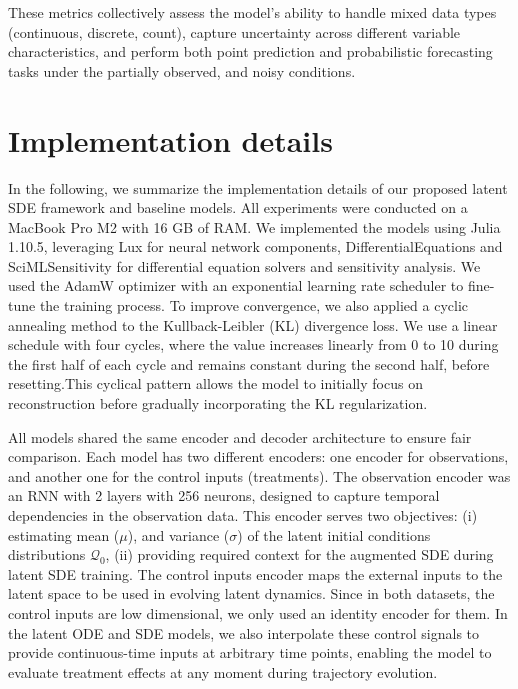\documentclass[preprint,12pt]{elsarticle}
\begin{document}
These metrics collectively assess the model's ability to handle mixed data types (continuous, discrete, count), capture uncertainty across different variable characteristics, and perform both point prediction and probabilistic forecasting tasks under the partially observed, and noisy conditions. 


\section{Implementation details}

In the following, we summarize the implementation details of our proposed latent SDE framework and baseline models. 
All experiments were conducted on a MacBook Pro M2 with 16 GB of RAM. We implemented the models using Julia 1.10.5, leveraging Lux for neural network components, DifferentialEquations and SciMLSensitivity for differential equation solvers and sensitivity analysis.
We used the AdamW optimizer with an exponential learning rate scheduler to fine-tune the training process. To improve convergence, we also applied a cyclic annealing method to the Kullback-Leibler (KL) divergence loss. We use a linear schedule with four cycles, where the value increases linearly from 0 to 10 during the first half of each cycle and remains constant during the second half, before resetting.This cyclical pattern allows the model to initially focus on reconstruction before gradually incorporating the KL regularization.

All models shared the same encoder and decoder architecture to ensure fair comparison. Each model has two different encoders: one encoder for observations, and another one for the control inputs (treatments). The observation encoder was an RNN with 2 layers with 256 neurons, designed to capture temporal dependencies in the observation data. This encoder serves two objectives: (i) estimating mean ($\mu$), and variance ($\sigma$) of the latent initial conditions distributions $\mathcal{Q}_0$, (ii) providing required context for the augmented SDE during latent SDE training. 
The control inputs encoder maps the external inputs to the latent space to be used in evolving latent dynamics. Since in both datasets, the control inputs are low dimensional, we only used an identity encoder for them. In the latent ODE and SDE models, we also interpolate these control signals to provide continuous-time inputs at arbitrary time points, enabling the model to evaluate treatment effects at any moment during trajectory evolution.
\end{document}
